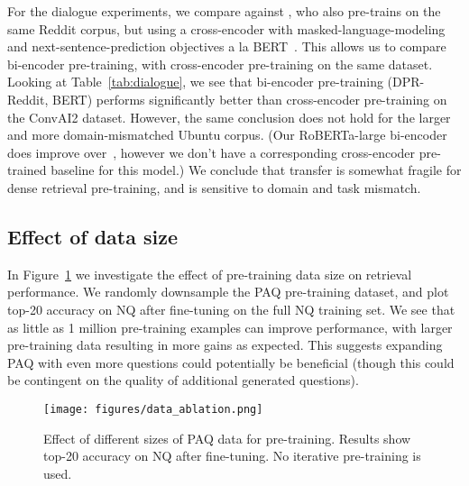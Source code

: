 \documentclass[11pt]{article}
\begin{document}
For the dialogue experiments, we compare against \cite{humeau2019poly}, who also pre-trains on the same Reddit corpus, but using a cross-encoder with masked-language-modeling and next-sentence-prediction objectives a la BERT~\citep{bert}.  This allows us to compare bi-encoder pre-training, with cross-encoder pre-training on the same dataset.  Looking at Table~\ref{tab:dialogue}, we see that bi-encoder pre-training (DPR-Reddit, BERT) performs significantly better than cross-encoder pre-training on the ConvAI2 dataset.  However, the same conclusion does not hold for the larger and more domain-mismatched Ubuntu corpus. (Our RoBERTa-large bi-encoder does improve over~\citep{humeau2019poly}, however we don't have a corresponding cross-encoder pre-trained baseline for this model.) We conclude that transfer is somewhat fragile for dense retrieval pre-training, and is sensitive to domain and task mismatch.

\subsection{Effect of data size}
In Figure~\ref{fig:ir-data-ablation} we investigate the effect of pre-training data size on retrieval performance.  We randomly downsample the PAQ pre-training dataset, and plot top-20 accuracy on NQ after fine-tuning on the full NQ training set.  We see that as little as 1 million pre-training examples can improve performance, with larger pre-training data resulting in more gains as expected.  This suggests expanding PAQ with even more questions could potentially be beneficial (though this could be contingent on the quality of additional generated questions).
\begin{figure}
    \centering
    \texttt{[image: figures/data\_ablation.png]}
    \caption{Effect of different sizes of PAQ data for pre-training.  Results show top-20 accuracy on NQ after fine-tuning.  No iterative pre-training is used.}
    \label{fig:ir-data-ablation}
\end{figure}
\end{document}
